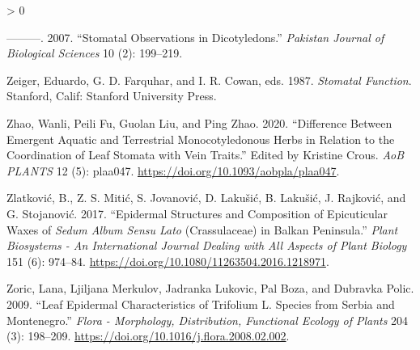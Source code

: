 \documentclass[
  10pt,
]{article}
\newlength{\cslhangindent}
\newenvironment{CSLReferences}[2] %
 {%
  \setlength{\parindent}{0pt}
  \ifodd #1 \everypar{\setlength{\hangindent}{\cslhangindent}}\ignorespaces\fi
  \ifnum #2 > 0
  \setlength{\parskip}{#2\baselineskip}
  \fi
 }%
 {}
\begin{document}
\begin{CSLReferences}{1}{0}
\leavevmode\hypertarget{ref-zarinkamar_stomatal_2007}{}%
---------. 2007. {``Stomatal Observations in Dicotyledons.''} \emph{Pakistan Journal of Biological Sciences} 10 (2): 199--219.

\leavevmode\hypertarget{ref-zeiger_stomatal_1987}{}%
Zeiger, Eduardo, G. D. Farquhar, and I. R. Cowan, eds. 1987. \emph{Stomatal Function}. Stanford, Calif: Stanford University Press.

\leavevmode\hypertarget{ref-zhao_difference_2020}{}%
Zhao, Wanli, Peili Fu, Guolan Liu, and Ping Zhao. 2020. {``Difference Between Emergent Aquatic and Terrestrial Monocotyledonous Herbs in Relation to the Coordination of Leaf Stomata with Vein Traits.''} Edited by Kristine Crous. \emph{AoB PLANTS} 12 (5): plaa047. \url{https://doi.org/10.1093/aobpla/plaa047}.

\leavevmode\hypertarget{ref-zlatkovic_epidermal_2017}{}%
Zlatković, B., Z. S. Mitić, S. Jovanović, D. Lakušić, B. Lakušić, J. Rajković, and G. Stojanović. 2017. {``Epidermal Structures and Composition of Epicuticular Waxes of \emph{{Sedum} Album Sensu Lato} ({Crassulaceae}) in {Balkan} {Peninsula}.''} \emph{Plant Biosystems - An International Journal Dealing with All Aspects of Plant Biology} 151 (6): 974--84. \url{https://doi.org/10.1080/11263504.2016.1218971}.

\leavevmode\hypertarget{ref-zoric_leaf_2009}{}%
Zoric, Lana, Ljiljana Merkulov, Jadranka Lukovic, Pal Boza, and Dubravka Polic. 2009. {``Leaf Epidermal Characteristics of {Trifolium} {L}. Species from {Serbia} and {Montenegro}.''} \emph{Flora - Morphology, Distribution, Functional Ecology of Plants} 204 (3): 198--209. \url{https://doi.org/10.1016/j.flora.2008.02.002}.

\end{CSLReferences}
\end{document}
